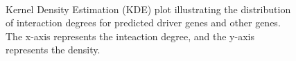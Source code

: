 
\vspace{0.5cm} %
\begin{figure}
	\centering
	\scriptsize
	\captionsetup{font=footnotesize}
	\\    
	\caption{Kernel Density Estimation (KDE) plot illustrating the distribution of interaction degrees for predicted driver genes and other genes. The x-axis represents the inteaction degree, and the y-axis represents the density.}
	\label{fig:kde_plot}
\end{figure}


